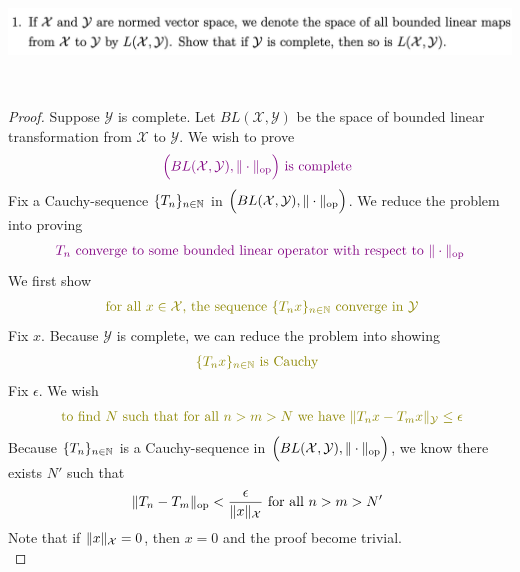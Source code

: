 \documentclass{report}
\begin{document}
\begin{question}{}{}
\includegraphics[height=3cm,width=18cm]{ahw4q1}
\end{question}
\begin{proof}
Suppose $\mathcal{Y}$ is complete. Let $BL(\mathcal{X},\mathcal{Y})$ be the space of bounded linear transformation from $\mathcal{X}$ to $\mathcal{Y}$. We wish to prove 
 \begin{align*}
\textcolor{violet}{\Big(BL(\mathcal{X},\mathcal{Y}),\| \cdot \|_{\text{op}} \Big)\text{ is complete }}
\end{align*}
Fix a Cauchy-sequence $\{ T_n \}_{n\in\mathbb{N}}$ in $\Big(BL(\mathcal{X},\mathcal{Y}),\| \cdot \|_{\text{op}} \Big)$. We reduce the problem into proving 
\begin{align*}
\textcolor{violet}{\text{ $T_n$ converge to some bounded linear operator with respect to $\| \cdot \|_\text{op}$ }}
\end{align*}
We first show 
\begin{align*}
\olive{\text{ for all $x\in \mathcal{X}$, the sequence $\set{T_nx}_{n\inn}$ converge in $\mathcal{Y}$}}
\end{align*}
Fix $x$. Because $\mathcal{Y}$ is complete, we can reduce the problem into showing 
\begin{align*}
\olive{\set{T_nx}_{n\inn}\text{ is Cauchy }}
\end{align*}
Fix $\epsilon $. We wish 
\begin{align*}
\olive{\text{ to find }N\text{ such that for all $n>m>N$ we have }\norm{T_nx-T_mx}_{\mathcal{Y}}\leq \epsilon }
\end{align*}
Because  $\{ T_n \}_{n\in\mathbb{N}}$ is a Cauchy-sequence in $\Big(BL(\mathcal{X},\mathcal{Y}),\| \cdot \|_{\text{op}} \Big)$, we know there exists $N'$ such that 
\begin{align*}
\| T_n-T_m \|_{\text{op}}< \frac{\epsilon }{\| x \|_{\mathcal{X}}} \text{ for all $n>m>N'$ }
\end{align*}
Note that if $\| x \|_{\mathcal{X}}=0$, then $x=0$ and the proof become trivial.\\


\end{proof}
\end{document}
